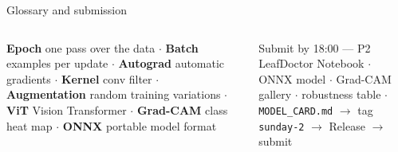 \documentclass[aspectratio=169,11pt]{beamer}
\begin{document}
\begin{frame}{Glossary and submission}
\begin{columns}[T]
\begin{bdef}[Glossary]
\textbf{Epoch} one pass over the data $\cdot$ \textbf{Batch} examples per update $\cdot$ \textbf{Autograd} automatic gradients $\cdot$ \textbf{Kernel} conv filter $\cdot$ \textbf{Augmentation} random training variations $\cdot$ \textbf{ViT} Vision Transformer $\cdot$ \textbf{Grad-CAM} class heat map $\cdot$ \textbf{ONNX} portable model format
\end{bdef}
\begin{block}{Submit by 18:00 --- P2 LeafDoctor}
Notebook $\cdot$ ONNX model $\cdot$ Grad-CAM gallery $\cdot$ robustness table $\cdot$ \texttt{MODEL\_CARD.md} $\rightarrow$ tag \texttt{sunday-2} $\rightarrow$ Release $\rightarrow$ submit
\end{block}
\end{columns}
\end{frame}
\end{document}
